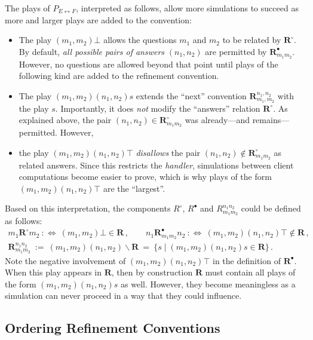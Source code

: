The plays of $P_{E \leftrightarrow F}$, interpreted as follows,
allow more simulations to succeed as
more and larger plays are added to the convention:
\begin{itemize}
  \item The play $(m_1, m_2)\bot$
    allows the questions $m_1$ and $m_2$
    to be related by $\mathbf{R}^\circ$.
    By default,
    \emph{all possible pairs of answers} $(n_1, n_2)$
    are permitted by $\mathbf{R}^\bullet_{m_1m_2}$.
    However, no questions are allowed beyond that point
    until plays of the following kind are added to the refinement convention.
  \item The play $(m_1, m_2)(n_1,n_2) s$
    extends the ``next'' convention $\mathbf{R}^{n_1,n_2}_{m_1,m_2}$
    with the play $s$.
    Importantly, it does \emph{not} modify
    the ``answers'' relation $\mathbf{R}^\circ$.
    As explained above, the pair $(n_1, n_2) \in \mathbf{R}^\circ_{m_1m_2}$
    was already---and remains---permitted.
    However,
  \item the play $(m_1,m_2)(n_1,n_2) \top$ \emph{disallows} the pair
    $(n_1, n_2) \notin \mathbf{R}^\circ_{m_1m_2}$ as related answers.
    Since this restricts the \emph{handler},
    simulations between client computations become easier to prove,
    which is why plays of the form $(m_1,m_2)(n_1,n_2)\top$ are the ``largest''.
\end{itemize}
Based on this interpretation,
the components $R^\circ$, $R^\bullet$
and $R_{m_1m_2}^{n_1n_2}$ could be defined as follows:
\begin{gather*}
  m_1 \mathrel{\mathbf{R}^\circ} m_2 \::\Leftrightarrow\:
  (m_1,m_2)\bot \in \mathbf{R}
  \,, \qquad
  n_1 \mathrel{\mathbf{R}^\bullet_{m_1m_2}} n_2 \::\Leftrightarrow\:
  (m_1,m_2)(n_1,n_2)\top \notin \mathbf{R}
  \,, \\[0.5ex]
  \mathbf{R}_{m_1m_2}^{n_1n_2} \: := \:
  (m_1,m_2)(n_1,n_2) \backslash \mathbf{R} \: = \:
  \{ s \mid (m_1,m_2)(n_1,n_2)s \in \mathbf{R} \}
  \,.
\end{gather*}
Note the negative involvement of $(m_1,m_2)(n_1,n_2)\top$
in the definition of $\mathbf{R}^\bullet$.
When this play appears in $\mathbf{R}$,
then by construction $\mathbf{R}$ must contain
all plays of the form $(m_1,m_2)(n_1,n_2)s$ as well.
However, they become meaningless
as a simulation can never proceed
in a way that they could influence.

\subsection{Ordering Refinement Conventions}

